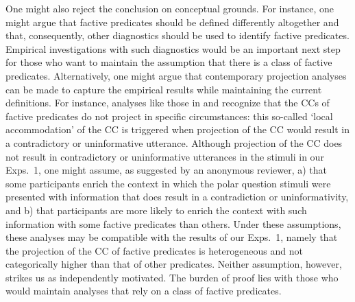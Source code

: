 \documentclass[11pt,fleqn]{article}
\newcommand{\6}{\mbox{$[\hspace*{-.6mm}[$}}
\newcommand{\9}{\mbox{$]\hspace*{-.6mm}]$}}
\begin{document}
One might also reject the conclusion on conceptual grounds. For instance, one might argue that factive predicates should be defined differently altogether and that, consequently, other diagnostics should be used to identify factive predicates. Empirical investigations with such diagnostics would be an important next step for those who want to maintain the assumption that there is a class of factive predicates. Alternatively, one might argue that contemporary projection analyses can be made to capture the empirical results while maintaining the current definitions. For instance, analyses like those in \citealt{heim83} and \citealt{vds92} recognize that the CCs of factive predicates do not project in specific circumstances: this so-called `local accommodation' of the CC is triggered when projection of the CC would result in a contradictory or uninformative utterance. Although projection of the CC does not result in contradictory or uninformative utterances in the stimuli in our Exps.~1, one might assume, as suggested by an anonymous reviewer, a) that some participants enrich the context in which the polar question stimuli were presented with information that does result in a contradiction or uninformativity, and b) that participants are more likely to enrich the context with such information with some factive predicates than others. Under these assumptions, these analyses may be compatible with the results of our Exps.~1, namely that the projection of the CC of factive predicates is heterogeneous and not categorically higher than that of other predicates. Neither assumption, however, strikes us as independently motivated. The burden of proof lies with those who would maintain analyses that rely on a class of factive predicates. 
\end{document}
